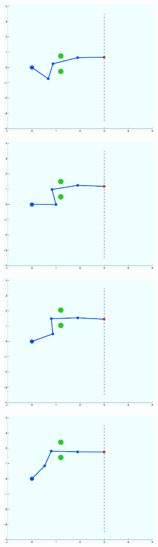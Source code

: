 \documentclass[a4paper, 11pt, english, greek]{article}
\begin{document}
\begin{figure}[htb]
  \centering
  \includegraphics[width=300px]{test7}
  \caption{}
\end{figure}

\begin{figure}[htb]
  \centering
  \includegraphics[width=300px]{test8}
  \caption{}
\end{figure}

\begin{figure}[htb]
  \centering
  \includegraphics[width=300px]{test9}
  \caption{}
\end{figure}

\begin{figure}[htb]
  \centering
  \includegraphics[width=300px]{test10}
  \caption{}
\end{figure}
\end{document}
